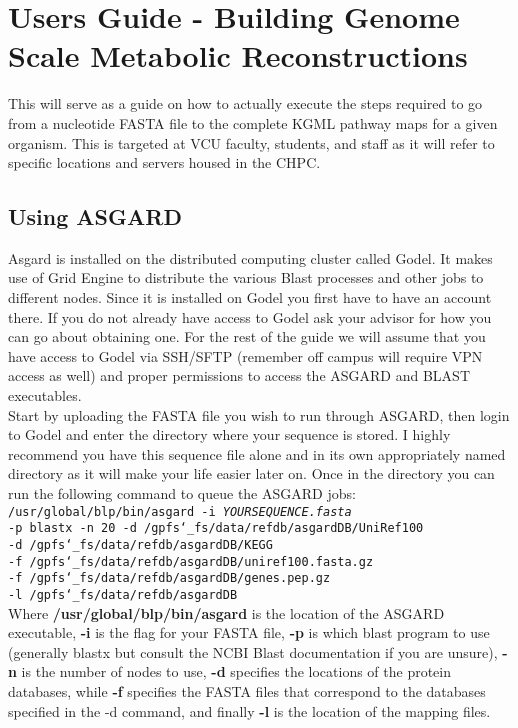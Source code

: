 
\chapter{Users Guide - Building Genome Scale Metabolic Reconstructions} %

\label{AppendixA} %

This will serve as a guide on how to actually execute the steps required to go from a nucleotide FASTA file to the complete KGML pathway maps for a given organism.  This is targeted at VCU faculty, students, and staff as it will refer to specific locations and servers housed in the CHPC.

\section{Using ASGARD}
\indent Asgard is installed on the distributed computing cluster called Godel.  It makes use of Grid Engine to distribute the various Blast processes and other jobs to different nodes. Since it is installed on Godel you first have to have an account there. If you do not already have access to Godel ask your advisor for how you can go about obtaining one. For the rest of the guide we will assume that you have access to Godel via SSH/SFTP (remember off campus will require VPN access as well) and proper permissions to access the ASGARD and BLAST executables.\\
Start by uploading the FASTA file you wish to run through ASGARD, then login to Godel and enter the directory where your sequence is stored. I highly recommend you have this sequence file alone and in its own appropriately named directory as it will make your life easier later on. Once in the directory you can run the following command to queue the ASGARD jobs:
\texttt{/usr/global/blp/bin/asgard -i \textit{YOURSEQUENCE.fasta} \\ 
-p blastx -n 20 -d /gpfs\char`_fs/data/refdb/asgardDB/UniRef100 \\
-d /gpfs\char`_fs/data/refdb/asgardDB/KEGG \\ 
-f /gpfs\char`_fs/data/refdb/asgardDB/uniref100.fasta.gz\\ 
-f /gpfs\char`_fs/data/refdb/asgardDB/genes.pep.gz \\
-l /gpfs\char`_fs/data/refdb/asgardDB}
\\
Where 
\textbf{/usr/global/blp/bin/asgard} is the location of the ASGARD executable, \textbf{-i} is the flag for your FASTA file, \textbf{-p} is which blast program to use (generally blastx but consult the NCBI Blast documentation if you are unsure), \textbf{-n} is the number of nodes to use, \textbf{-d} specifies the locations of the protein databases, while \textbf{-f} specifies the FASTA files that correspond to the databases specified in the -d command, and finally \textbf{-l} is the location of the mapping files.\\
